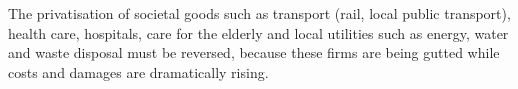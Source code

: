 The privatisation of societal goods such as transport (rail, local public transport), health care, hospitals, care for the elderly and local utilities such as energy, water and waste disposal must be reversed, because these firms are being gutted while costs and damages are dramatically rising.